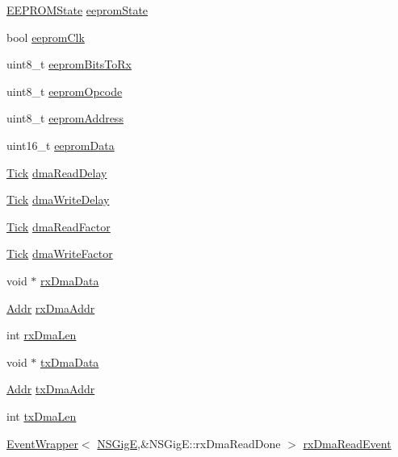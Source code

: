 \begin{DoxyCompactItemize}
\item 
\hyperlink{classNSGigE_ae796bda509051d219eda8ee36e00107f}{EEPROMState} \hyperlink{classNSGigE_a4ce8dbf0ad152b6c486db02f419fed6a}{eepromState}
\item 
bool \hyperlink{classNSGigE_a9dc216175b8363fc4cc76ca9c69a6711}{eepromClk}
\item 
uint8\_\-t \hyperlink{classNSGigE_a426dbbe4e38f3673cdeb37278acfdd20}{eepromBitsToRx}
\item 
uint8\_\-t \hyperlink{classNSGigE_a246cb6d4fbdcd825c80df294eeeacfb9}{eepromOpcode}
\item 
uint8\_\-t \hyperlink{classNSGigE_ad973ee69287e37674f36a595d4f450f2}{eepromAddress}
\item 
uint16\_\-t \hyperlink{classNSGigE_adbab5cd5542c7e27cba0f2bdf4943fdc}{eepromData}
\item 
\hyperlink{base_2types_8hh_a5c8ed81b7d238c9083e1037ba6d61643}{Tick} \hyperlink{classNSGigE_abff269bf1752a04839eb356b47d4348b}{dmaReadDelay}
\item 
\hyperlink{base_2types_8hh_a5c8ed81b7d238c9083e1037ba6d61643}{Tick} \hyperlink{classNSGigE_add556e09206ac9f4675d3e2da53339e8}{dmaWriteDelay}
\item 
\hyperlink{base_2types_8hh_a5c8ed81b7d238c9083e1037ba6d61643}{Tick} \hyperlink{classNSGigE_a632abfe8a89dfa1d944547874f1b4fe4}{dmaReadFactor}
\item 
\hyperlink{base_2types_8hh_a5c8ed81b7d238c9083e1037ba6d61643}{Tick} \hyperlink{classNSGigE_a396f950eb0d0a011cfa5790861e32608}{dmaWriteFactor}
\item 
void $\ast$ \hyperlink{classNSGigE_ad2ec4911ac2ba9d13946d044e0a7ec11}{rxDmaData}
\item 
\hyperlink{base_2types_8hh_af1bb03d6a4ee096394a6749f0a169232}{Addr} \hyperlink{classNSGigE_a4a609f84c6849bcfb6dee08329773fca}{rxDmaAddr}
\item 
int \hyperlink{classNSGigE_afe607a5f463bca368d7fe1e57d15a03c}{rxDmaLen}
\item 
void $\ast$ \hyperlink{classNSGigE_ae2121dfc4012d186f5762f53c7f9e248}{txDmaData}
\item 
\hyperlink{base_2types_8hh_af1bb03d6a4ee096394a6749f0a169232}{Addr} \hyperlink{classNSGigE_aef3a8dd866e8017fd7a675414596ec6b}{txDmaAddr}
\item 
int \hyperlink{classNSGigE_a5782be4cae30f9377ab0c645a9f65892}{txDmaLen}
\item 
\hyperlink{classEventWrapper}{EventWrapper}$<$ \hyperlink{classNSGigE}{NSGigE},\&NSGigE::rxDmaReadDone $>$ \hyperlink{classNSGigE_a61b576743cc2713534c8a66b5d4a85dc}{rxDmaReadEvent}

\end{DoxyCompactItemize}
